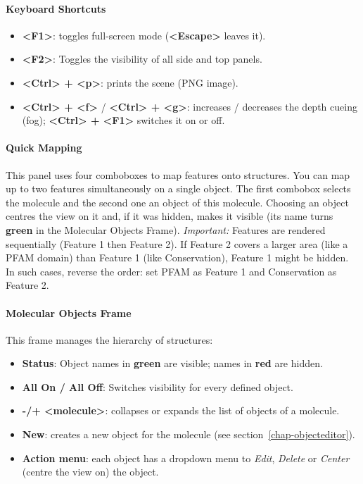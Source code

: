 \documentclass[a4paper]{article}
\begin{document}
\paragraph{Keyboard Shortcuts}
\begin{itemize}
    \item \textbf{<F1>}: toggles full-screen mode (\textbf{<Escape>} leaves it).
    \item \textbf{<F2>}: Toggles the visibility of all side and top panels.
    \item \textbf{<Ctrl> + <p>}: prints the scene (PNG image).
    \item \textbf{<Ctrl> + <f>} / \textbf{<Ctrl> + <g>}: increases / decreases the depth cueing (fog); \textbf{<Ctrl> + <F1>} switches it on or off.
\end{itemize}

\paragraph{Quick Mapping}
This panel uses four comboboxes to map features onto structures. You can map up to two features simultaneously on a single object. 
The first combobox selects the molecule and the second one an object of this molecule. Choosing an object centres the view on it and, if it was hidden, makes it visible (its name turns \textbf{green} in the Molecular Objects Frame).
\textit{Important:} Features are rendered sequentially (Feature 1 then Feature 2). If Feature 2 covers a larger area (like a PFAM domain) than Feature 1 (like Conservation), Feature 1 might be hidden. In such cases, reverse the order: set PFAM as Feature 1 and Conservation as Feature 2.

\paragraph{Molecular Objects Frame}
This frame manages the hierarchy of structures:
\begin{itemize}
    \item \textbf{Status}: Object names in \textbf{green} are visible; names in \textbf{red} are hidden.
    \item \textbf{All On / All Off}: Switches visibility for every defined object.
    \item \textbf{-/+ <molecule>}: collapses or expands the list of objects of a molecule.
    \item \textbf{New}: creates a new object for the molecule (see section~\ref{chap-objecteditor}).
    \item \textbf{Action menu}: each object has a dropdown menu to \textit{Edit}, \textit{Delete} or \textit{Center} (centre the view on) the object.
\end{itemize}
\end{document}
